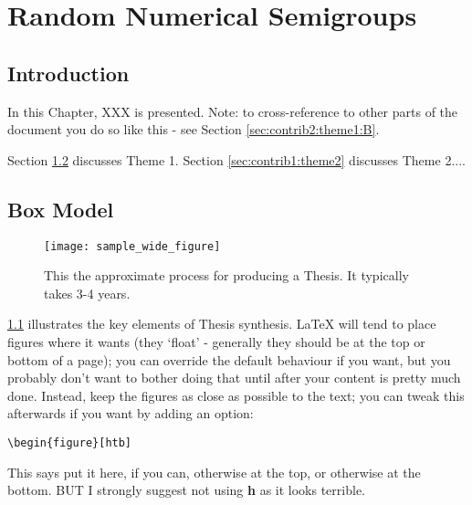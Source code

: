 
\chapter{Random Numerical Semigroups}\label{chap:contrib1}

\section{Introduction}

In this Chapter, XXX is presented. Note: to cross-reference to other parts of the document you do so like this - see Section \ref{sec:contrib2:theme1:B}.

Section \ref{sec:contrib1:theme1} discusses Theme 1. Section \ref{sec:contrib1:theme2} discusses Theme 2....

\section{Box Model}\label{sec:contrib1:theme1}

\begin{figure}
\centering
\texttt{[image: sample\_wide\_figure]}
\caption{This the approximate process for producing a Thesis. It typically takes 3-4 years.}
\label{fig:phd_life}
\end{figure}

\figurename{} \ref{fig:phd_life} illustrates the key elements of Thesis synthesis. \LaTeX{} will tend to place figures where it wants (they `float' - generally they should be at the top or bottom of a page); you can override the default behaviour if you want, but you probably don't want to bother doing that until after your content is pretty much done. Instead, keep the figures as close as possible to the text; you can tweak this afterwards if you want by adding an option:

\begin{verbatim}
\begin{figure}[htb]
\end{verbatim}

This says put it here, if you can, otherwise at the top, or otherwise at the bottom. BUT I strongly suggest not using {\bf h} as it looks terrible.

